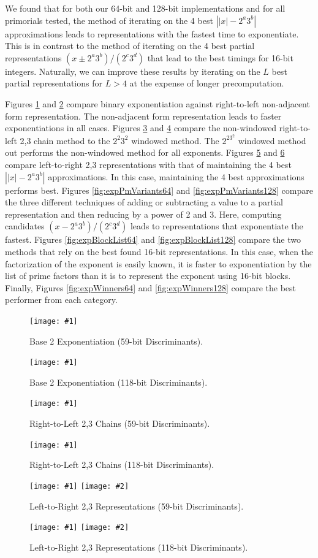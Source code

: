 \documentclass{ucalgthes1}
\theoremstyle{definition}
\newcommand{\mygraph}[3]{
	\begin{figure}[H]
	\centering
	\texttt{[image: \#1]}
	\caption{#3}
	\label{#2}
	\end{figure}
}
\newcommand{\mygraphTwo}[4]{
	\begin{figure}[H]
	\centering
	\texttt{[image: \#1]}
	\texttt{[image: \#2]}
	\caption{#4}
	\label{#3}
	\end{figure}
}
\begin{document}
We found that for both our 64-bit and 128-bit implementations and for all primorials tested, the method of iterating on the 4 best $\left||x| - 2^a3^b\right|$ approximations leads to representations with the fastest time to exponentiate.  This is in contrast to the method of iterating on the 4 best partial representations $(x \pm 2^a3^b)/(2^c3^d)$ that lead to the best timings for 16-bit integers.  Naturally, we can improve these results by iterating on the $L$ best partial representations for $L > 4$ at the expense of longer precomputation.

Figures \ref{fig:expBinNaf64} and \ref{fig:expBinNaf128} compare binary exponentiation against right-to-left non-adjacent form representation.  The non-adjacent form representation leads to faster exponentiations in all cases.  Figures \ref{fig:expDbnsR2L64} and \ref{fig:expDbnsR2L128} compare the non-windowed right-to-left 2,3 chain method to the $2^2 3^2$ windowed method.  The $2^23^2$ windowed method out performs the non-windowed method for all exponents.  Figures \ref{fig:expDbnsL2R64} and \ref{fig:expDbnsL2R128} compare left-to-right 2,3 representations with that of maintaining the 4 best $\left||x|-2^a3^b\right|$ approximations.  In this case, maintaining the 4 best approximations performs best.  Figures \ref{fig:expPmVariants64} and \ref{fig:expPmVariants128} compare the three different techniques of adding or subtracting a value to a partial representation and then reducing by a power of 2 and 3.  Here, computing candidates $(x-2^a3^b)/(2^c3^d)$ leads to representations that exponentiate the fastest.  Figures \ref{fig:expBlockList64} and \ref{fig:expBlockList128} compare the two methods that rely on the best found 16-bit representations.  In this case, when the factorization of the exponent is easily known, it is faster to exponentiation by the list of prime factors than it is to represent the exponent using 16-bit blocks.  Finally, Figures \ref{fig:expWinners64} and \ref{fig:expWinners128} compare the best performer from each category.

\mygraph{binary_vs_naf-64}{fig:expBinNaf64}{Base 2 Exponentiation (59-bit Discriminants).}
\mygraph{binary_vs_naf-128}{fig:expBinNaf128}{Base 2 Exponentiation (118-bit Discriminants).}

\mygraph{dbns_r2ls-64}{fig:expDbnsR2L64}{Right-to-Left 2,3 Chains (59-bit Discriminants).}
\mygraph{dbns_r2ls-128}{fig:expDbnsR2L128}{Right-to-Left 2,3 Chains (118-bit Discriminants).}

\mygraphTwo{dbns_l2rs-64}{dbns_l2rs-64-zoom}{fig:expDbnsL2R64}{Left-to-Right 2,3 Representations (59-bit Discriminants).}
\mygraphTwo{dbns_l2rs-128}{dbns_l2rs-128-zoom}{fig:expDbnsL2R128}{Left-to-Right 2,3 Representations (118-bit Discriminants).}
\end{document}
